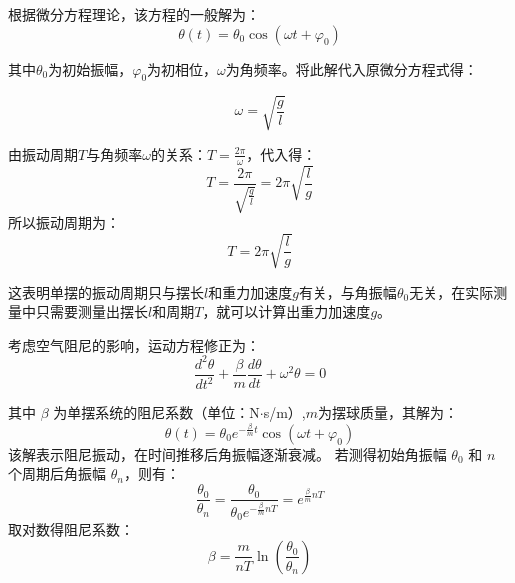 \begin{TertiaryBox}[重力加速度测量原理]
根据微分方程理论，该方程的一般解为：
\begin{equation}
    \theta(t) = \theta_0 \cos(\omega t + \varphi_0)
\end{equation}

其中$\theta_0$为初始振幅，$\varphi_0$为初相位，$\omega$为角频率。将此解代入原微分方程式得：

\begin{equation}
  \omega = \sqrt{\frac{g}{l}}
\end{equation}

由振动周期$T$与角频率$\omega$的关系：$T = \frac{2\pi}{\omega}$，代入得：
\begin{equation}
T = \frac{2\pi}{\sqrt{\frac{g}{l}}} = 2\pi\sqrt{\frac{l}{g}}
\end{equation}
所以振动周期为：
\begin{equation}
T = 2\pi\sqrt{\frac{l}{g}}
\end{equation}
\end{TertiaryBox}

这表明单摆的振动周期只与摆长$l$和重力加速度$g$有关，与角振幅$\theta_0$无关，在实际测量中只需要测量出摆长$l$和周期$T$，就可以计算出重力加速度$g$。



\begin{TertiaryBox}[阻尼系数测量原理]
考虑空气阻尼的影响，运动方程修正为：
\begin{equation}
\frac{d^2\theta}{dt^2} + \frac{\beta}{m} \frac{d\theta}{dt} + \omega^2 \theta = 0
\end{equation}

其中 $\beta$ 为单摆系统的阻尼系数（单位：N$\cdot$s/m）,$m$为摆球质量，其解为：
\begin{equation}
\theta(t) = \theta_0 e^{-\frac{\beta}{m} t} \cos(\omega t + \varphi_0)
\end{equation}
该解表示阻尼振动，在时间推移后角振幅逐渐衰减。
若测得初始角振幅 $\theta_0$ 和 $n$ 个周期后角振幅 $\theta_n$，则有：
\begin{equation}
\frac{\theta_0}{\theta_n} = \frac{\theta_0}{\theta_0 e^{-\frac{\beta}{m} nT}} = e^{\frac{\beta}{m} nT}
\end{equation}
取对数得阻尼系数：
\begin{equation}
\beta = \frac{m}{nT} \ln\left(\frac{\theta_0}{\theta_n}\right)
\end{equation}
\end{TertiaryBox}

